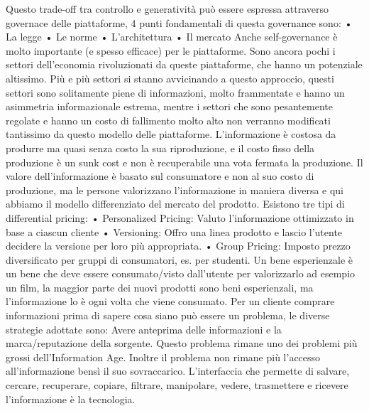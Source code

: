 \documentclass[11pt, a4page, twocolumn]{article}
\begin{document}
Questo trade-off tra controllo e generatività può essere espressa attraverso governace delle piattaforme, 4 punti fondamentali di questa governance sono:
    • La legge
    • Le norme
    • L'architettura
    • Il mercato
Anche self-governance è molto importante (e spesso efficace) per le piattaforme. Sono ancora pochi i settori dell’economia rivoluzionati da queste piattaforme, che hanno un potenziale altissimo. Più e più settori si stanno avvicinando a questo approccio, questi settori sono solitamente piene di informazioni,  molto frammentate e hanno un asimmetria informazionale estrema, mentre i settori che sono pesantemente regolate e hanno un costo di fallimento molto alto non verranno modificati tantissimo da questo modello delle piattaforme. 
L’informazione è costosa da produrre ma quasi senza costo la sua riproduzione, e il costo fisso della produzione è un sunk cost e non è recuperabile una vota fermata la produzione. Il valore dell’informazione è basato sul consumatore e non al suo costo di produzione, ma le persone valorizzano l’informazione in maniera diversa e qui abbiamo il modello differenziato del mercato del prodotto. Esistono tre tipi di differential pricing:
    • Personalized Pricing: Valuto l’informazione ottimizzato in base a ciascun cliente
    • Versioning: Offro una linea prodotto e lascio l’utente decidere la versione per loro più appropriata.
    • Group Pricing: Imposto prezzo diversificato per gruppi di consumatori, es. per studenti.
Un bene esperienzale è un bene che deve essere consumato/visto dall’utente per valorizzarlo ad esempio un film, la maggior parte dei nuovi prodotti sono beni esperienzali, ma l’informazione lo è ogni volta che viene consumato. Per un cliente comprare informazioni prima di sapere cosa siano può essere un problema, le diverse strategie adottate sono: Avere anteprima delle informazioni e la marca/reputazione della sorgente. Questo problema rimane uno dei problemi più grossi dell’Information Age. Inoltre il problema non rimane più l’accesso all’informazione bensì il suo sovraccarico. L’interfaccia che permette di salvare, cercare, recuperare, copiare, filtrare, manipolare, vedere, trasmettere e ricevere l’informazione è la tecnologia. 
\end{document}
